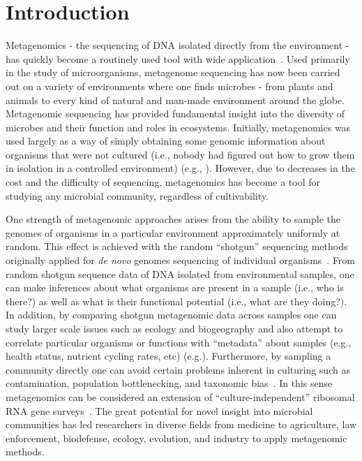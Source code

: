 \documentclass[10pt]{article}
\begin{document}

\clearpage

\section*{Introduction}

Metagenomics - the sequencing of DNA isolated directly from the environment - has quickly become a routinely used tool with wide application~\cite{thomas2012metagenomics}. Used primarily in the study of microorganisms, metagenome sequencing has now been carried out on a variety of environments where one finds microbes - from plants and animals to every kind of natural and man-made environment around the globe.
Metagenomic sequencing has provided fundamental insight into the diversity of microbes and their function and roles in ecosystems.
Initially, metagenomics was used largely as a way of simply obtaining some genomic information about organisms that were not cultured (i.e., nobody had figured out how to grow them in isolation in a controlled environment) (e.g., \cite{beja2000bacterial}).
However, due to decreases in the cost and the difficulty of sequencing, metagenomics has become a tool for studying any microbial community, regardless of cultivability.

One strength of metagenomic approaches arises from the ability to sample the genomes of organisms in a particular environment approximately uniformly at random.  This effect is achieved with the random ``shotgun'' sequencing methods originally applied for \textit{de novo} genomes sequencing of individual organisms~\cite{venter2004environmental,tyson2004community}.
From random shotgun sequence data of DNA isolated from environmental samples, one can make inferences about what organisms are present in a sample (i.e., who is there?) as well as what is their functional potential (i.e., what are they doing?).
In addition, by comparing shotgun metagenomic data across samples one can study larger scale issues such as ecology and biogeography and also attempt to correlate particular organisms or functions with ``metadata'' about samples (e.g., health status, nutrient cycling rates, etc) (e.g.\cite{tringe2005comparative}).
Furthermore, by sampling a community directly one can avoid certain problems inherent in culturing such as contamination, population bottlenecking, and taxonomic bias~\cite{eisen2007environmental}.  In this sense metagenomics can be considered an extension of ``culture-independent'' ribosomal RNA gene surveys~\cite{hugenholtz1998impact}. 
The great potential for novel insight into microbial communities has led researchers in diverse fields from medicine to agriculture, law enforcement, biodefense, ecology, evolution, and industry to apply metagenomic methods.
\end{document}
